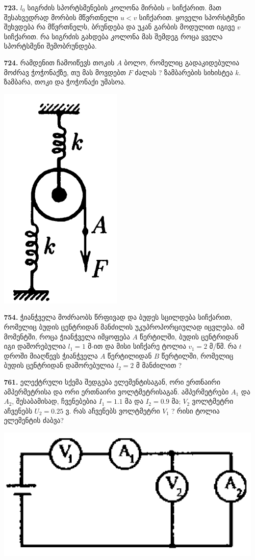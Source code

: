\documentclass[12pt,a4paper,]{report}
\begin{document}
\textbf{723.} $l_0$ სიგრძის სპორტსმენების კოლონა მირბის $v$ სიჩქარით. მათ შესახვედრად მორბის მწვრთნელი $u<v$ სიჩქარით. ყოველი სპორსტმენი შეხვდება რა მწვრთნელს, ბრუნდება და უკან გარბის მოდულით იგივე $v$ სიჩქარით. რა სიგრძის გახდება კოლონა მას შემდეგ როცა ყველა სპორტსმენი შემობრუნდება.
		
\textbf{724.} რამდენით ჩამოიწევს თოკის $A$ ბოლო, რომელიც გადაკიდებულია მოძრავ ჭოჭონაქზე, თუ მას მოვდებთ $F$ ძალას ? ზამბარების სიხისტეა $k$. ზამბარა, თოკი და ჭოჭონაქი უმასოა.
		\begin{center}
			\includegraphics[scale=0.3]{images/724.png}
		\end{center}

\textbf{754.} ჭიანჭველა მოძრაობს წრფივად და ბუდეს სცილდება სიჩქარით, რომელიც ბუდის ცენტრიდან მანძილის უკუპროპორციულად იცვლება. იმ მომენტში, როცა ჭიანჭველა იმყოფება $A$ წერტილში, ბუდის ცენტრიდან იგი დაშორებულია $l_1=1$ მ-ით და მისი სიჩქარე ტოლია  $v_1=2$ მ/წმ. რა $t$ დროში მიაღწევს ჭიანჭველა $A$ წერტილიდან $B$ წერტილში, რომელიც ბუდის ცენტრიდან დაშორებულია $l_2=2$ მ მანძილით ? 

\textbf{761.} ელექტრული სქემა შედგება ელემენტისაგან, ორი ერთნაირი ამპერმეტრისა და ორი ერთნაირი ვოლტმეტრისაგან. ამპერმეტრები $A_1$ და $A_2$, შესაბამისად, ჩვენებებია $I_1 = 1.1$ მა და $I_2 = 0.9$ მა; $V_2$ ვოლტმეტრი აჩვენებს $U_2 = 0.25$ ვ. რას აჩვენებს ვოლტმეტრი $V_1$ ? რისი ტოლია ელემენტის ძაბვა?
		\begin{center}
			\includegraphics[scale=0.3]{images/761}
		\end{center}
\end{document}
